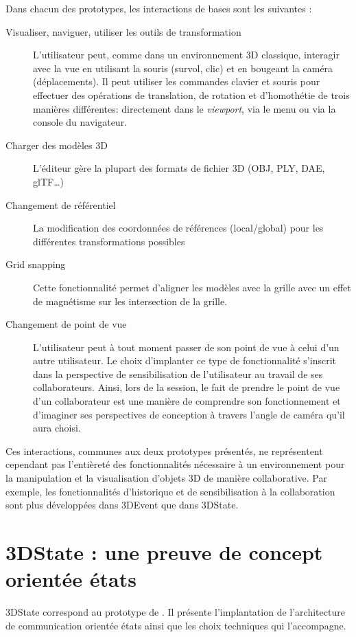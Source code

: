 Dans chacun des prototypes, les interactions de bases sont les suivantes :
\begin{description}
	
	\item[Visualiser, naviguer, utiliser les outils de transformation] L'utilisateur peut, 
	com\-me dans un environnement \gls{3D} classique, interagir avec la vue en 
	utilisant 
	la souris (survol, clic) et en bougeant la caméra (déplacements). Il peut 
	utiliser les commandes clavier et souris pour effectuer des opérations de 
	translation, de rotation et d'homothétie de trois manières différentes: 
	directement dans le \textit{viewport}, via le 
	menu ou via la console du navigateur.
	\item[Charger des modèles \gls{3D}] L'éditeur gère la plupart des formats de 
	fichier 
	3D (OBJ, PLY, DAE, glTF\ldots)
	\item[Changement de référentiel] La modification des coordonnées de 
	réfé\-ren\-ces (local/global)  pour les différentes transformations possibles
	\item[Grid snapping] Cette fonctionnalité permet d'aligner les modèles avec la 
	grille avec un effet de magnétisme sur les intersection de la grille.
	\item[Changement de point de vue] L'utilisateur peut à tout moment passer de 
	son point de vue à celui d'un autre utilisateur. Le choix d'implanter ce type de 
	fonctionnalité s'inscrit dans la perspective de sensibilisation de l'utilisateur au 
	travail de ses collaborateurs. Ainsi, lors de la session, le fait de prendre le 
	point de vue d'un collaborateur est une manière de 
	comprendre son fonctionnement et d'imaginer ses 
	perspectives de conception à travers l'angle de caméra qu'il aura choisi.
\end{description}

Ces interactions, communes aux deux prototypes présentés, ne 
représentent cependant pas l'entièreté des fonctionnalités nécessaire à un 
environnement pour la manipulation et la visualisation d'objets 3D de manière 
collaborative. Par exemple, les fonctionnalités d'historique et de sensibilisation à 
la collaboration sont plus développées dans 3DEvent que dans 3DState.

\section{3DState : une preuve de concept orientée états}
\label{sec:3DState}
3DState correspond au prototype de 
\cite{Desprat2015a,Desprat2015b}. Il présente l'implantation de l'architecture de 
communication orientée états ainsi que les choix techniques qui l'accompagne.


